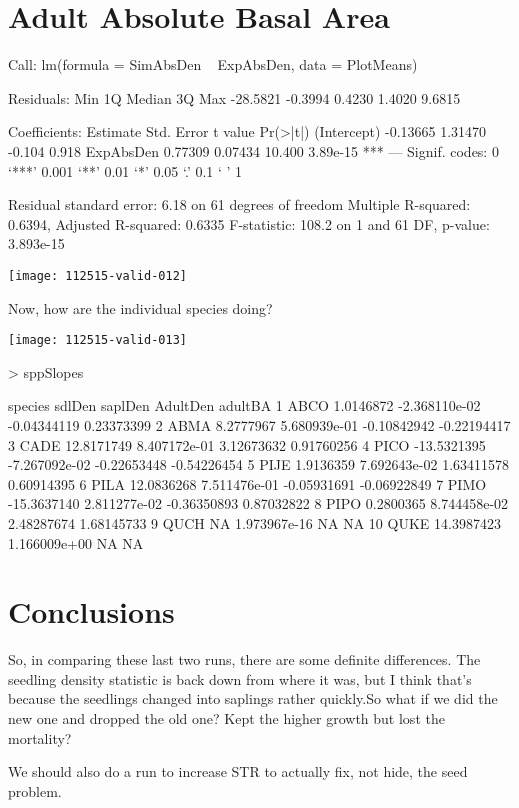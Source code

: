 \documentclass{article}
\begin{document}
\section{Adult Absolute Basal Area}
\begin{Schunk}
\begin{Soutput}
Call:
lm(formula = SimAbsDen ~ ExpAbsDen, data = PlotMeans)

Residuals:
     Min       1Q   Median       3Q      Max 
-28.5821  -0.3994   0.4230   1.4020   9.6815 

Coefficients:
            Estimate Std. Error t value Pr(>|t|)    
(Intercept) -0.13665    1.31470  -0.104    0.918    
ExpAbsDen    0.77309    0.07434  10.400 3.89e-15 ***
---
Signif. codes:  0 ‘***’ 0.001 ‘**’ 0.01 ‘*’ 0.05 ‘.’ 0.1 ‘ ’ 1

Residual standard error: 6.18 on 61 degrees of freedom
Multiple R-squared:  0.6394,	Adjusted R-squared:  0.6335 
F-statistic: 108.2 on 1 and 61 DF,  p-value: 3.893e-15
\end{Soutput}
\end{Schunk}
\texttt{[image: 112515-valid-012]}

Now, how are the individual species doing?

\texttt{[image: 112515-valid-013]}
\begin{Schunk}
\begin{Sinput}
>   sppSlopes
\end{Sinput}
\begin{Soutput}
   species      sdlDen       saplDen    AdultDen     adultBA
1     ABCO   1.0146872 -2.368110e-02 -0.04344119  0.23373399
2     ABMA   8.2777967  5.680939e-01 -0.10842942 -0.22194417
3     CADE  12.8171749  8.407172e-01  3.12673632  0.91760256
4     PICO -13.5321395 -7.267092e-02 -0.22653448 -0.54226454
5     PIJE   1.9136359  7.692643e-02  1.63411578  0.60914395
6     PILA  12.0836268  7.511476e-01 -0.05931691 -0.06922849
7     PIMO -15.3637140  2.811277e-02 -0.36350893  0.87032822
8     PIPO   0.2800365  8.744458e-02  2.48287674  1.68145733
9     QUCH          NA  1.973967e-16          NA          NA
10    QUKE  14.3987423  1.166009e+00          NA          NA
\end{Soutput}
\end{Schunk}


\section{Conclusions}

So, in comparing these last two runs, there are some definite differences. The seedling density statistic is back down from where it was, but I think that's because the seedlings changed into saplings rather quickly.So what if we did the new one and dropped the old one? Kept the higher growth but lost the mortality?

We should also do a run to increase STR to actually fix, not hide, the seed problem. 
\end{document}
